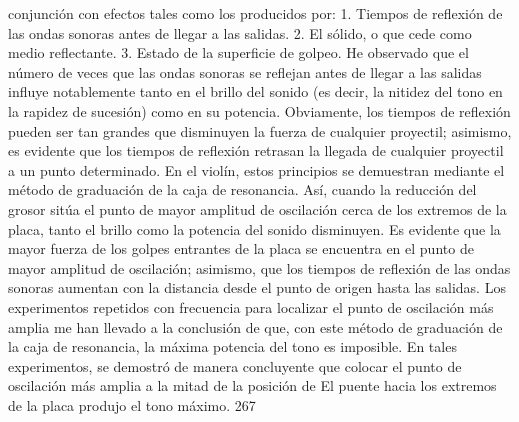 conjunción con efectos tales como los producidos por:
1. Tiempos de reflexión de las ondas sonoras antes de llegar a las salidas.
2. El sólido, o que cede como medio reflectante.
3. Estado de la superficie de golpeo.
He observado que el número de veces que las ondas sonoras se reflejan antes de llegar a las salidas influye notablemente tanto en el brillo del sonido (es decir, la nitidez del tono en la rapidez de sucesión) como en su potencia. Obviamente, los tiempos de reflexión pueden ser tan grandes que disminuyen la fuerza de cualquier proyectil; asimismo, es evidente que los tiempos de reflexión retrasan la llegada de cualquier proyectil a un punto determinado. En el violín, estos principios se demuestran mediante el método de graduación de la caja de resonancia. Así, cuando la reducción del grosor sitúa el punto de mayor amplitud de oscilación cerca de los extremos de la placa, tanto el brillo como la potencia del sonido disminuyen. Es evidente que la mayor fuerza de los golpes entrantes de la placa se encuentra en el punto de mayor amplitud de oscilación; asimismo, que los tiempos de reflexión de las ondas sonoras aumentan con la distancia desde el punto de origen hasta las salidas. Los experimentos repetidos con frecuencia para localizar el punto de oscilación más amplia me han llevado a la conclusión de que, con este método de graduación de la caja de resonancia, la máxima potencia del tono es imposible. En tales experimentos, se demostró de manera concluyente que colocar el punto de oscilación más amplia a la mitad de la posición de
El puente hacia los extremos de la placa produjo el tono máximo.
267

